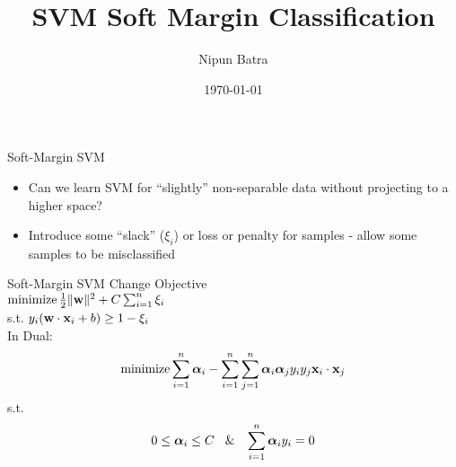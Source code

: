 \documentclass{beamer}
\title{SVM Soft Margin Classification}
\date{\today}
\author{Nipun Batra}
\institute{IIT Gandhinagar}
\begin{document}
	\maketitle
	
{
	
}

	

	\begin{frame}{Soft-Margin SVM}
	\begin{itemize}[<+->]
		\item Can we learn SVM for ``slightly'' non-separable data without projecting to a higher space? 
		\item Introduce some ``slack'' ($\xi_i$) or loss or penalty for samples - allow some samples to be misclassified
		
	\end{itemize}
		
		
		
	\end{frame}

{
	
}
	
	\begin{frame}{Soft-Margin SVM}
		Change Objective \\
		\vspace{0.1cm}
		$\operatorname{minimize} \frac{1}{2}\|\mathbf{w}\|^{2} + C \sum_{i=1}^{n}\xi_{i}$ \\ s.t. $y_{i}(\mathbf{w} \cdot \mathbf{x}_i + b) \geq 1 - \xi_{i}$ \\
		
		\vspace{0.2cm}
		\pause In Dual:
		$$\operatorname{minimize} \sum_{i=1}^{n}\boldsymbol{\alpha}_{i} - \sum_{i=1}^{n}\sum_{j=1}^{n}\boldsymbol{\alpha}_{i}\boldsymbol{\alpha}_{j}y_{i}y_{j}\mathbf{x}_{i} \cdot \mathbf{x}_{j}$$
		s.t.
		$$0 \leq \boldsymbol{\alpha}_{i} \leq C \text{\hspace{0.3cm}\&\hspace{0.3cm}} \sum_{i=1}^{n}\boldsymbol{\alpha}_{i}y_{i} = 0$$
		
	\end{frame}
\end{document}
